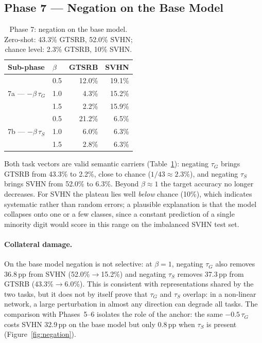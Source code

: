 \documentclass[11pt,a4paper,twocolumn]{article}
\newcommand{\tG}{\tau_G}
\newcommand{\tS}{\tau_S}
\newcommand{\pp}{\,pp}
\begin{document}
\subsection{Phase 7 --- Negation on the Base Model}

\begin{table}[t]
\centering\small
\begin{tabular}{@{}llrr@{}}
\toprule
Sub-phase & $\beta$ & GTSRB & SVHN \\
\midrule
\multirow{3}{*}{7a --- $-\beta\,\tG$}
 & 0.5 & 12.0\% & 19.1\% \\
 & 1.0 & 4.3\% & 15.2\% \\
 & 1.5 & 2.2\% & 15.9\% \\
\midrule
\multirow{3}{*}{7b --- $-\beta\,\tS$}
 & 0.5 & 21.2\% & 6.5\% \\
 & 1.0 & 6.0\% & 6.3\% \\
 & 1.5 & 2.8\% & 6.3\% \\
\bottomrule
\end{tabular}
\caption{Phase 7: negation on the base model. Zero-shot: 43.3\% GTSRB,
52.0\% SVHN; chance level: 2.3\% GTSRB, 10\% SVHN.}
\label{tab:phase7}
\end{table}

Both task vectors are valid semantic carriers (Table~\ref{tab:phase7}):
negating $\tG$ brings GTSRB from 43.3\% to 2.2\%, close to chance
($1/43\approx2.3\%$), and negating $\tS$ brings SVHN from 52.0\% to 6.3\%.
Beyond $\beta\approx1$ the target accuracy no longer decreases. For SVHN
the plateau lies well \emph{below} chance (10\%), which indicates
systematic rather than random errors; a plausible explanation is that the
model collapses onto one or a few classes, since a constant prediction of
a single minority digit would score in this range on the imbalanced SVHN
test set.

\paragraph{Collateral damage.} On the base model negation is not
selective: at $\beta=1$, negating $\tG$ also removes 36.8\pp{} from SVHN
(52.0\%$\rightarrow$15.2\%) and negating $\tS$ removes 37.3\pp{} from GTSRB
(43.3\%$\rightarrow$6.0\%). This is consistent with representations shared
by the two tasks, but it does not by itself prove that $\tG$ and $\tS$
overlap: in a non-linear network, a large perturbation in almost any
direction can degrade all tasks. The comparison with Phases~5--6 isolates
the role of the anchor: the same $-0.5\,\tG$ costs SVHN 32.9\pp{} on the
base model but only 0.8\pp{} when $\tS$ is present
(Figure~\ref{fig:negation}).
\end{document}
